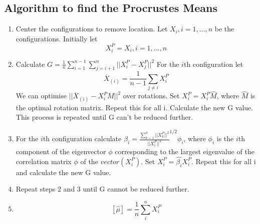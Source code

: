 \documentclass{article}
\begin{document}
\subsection{Algorithm to find the Procrustes Means}
\begin{enumerate}
    \item Center the configurations to remove location. Let $X_{i}, i = 1, \dots,n $ be the configurations. Initially let 
    \[X_{i}^{P} = X_{i}, i = 1, \dots,n  \]
    \item Calculate $G = \frac{1}{n} \sum_{i=1}^{n-1} \sum_{j = i+1}^{n} ||X_{i}^{P} - X_{j}^{P}||^{2}$
    For the $i$th configuration let 
    \[\overline{X}_{(i)} = \frac{1}{n-1} \sum_{j \neq i} X_{i}^{P}\]
    We can optimise $|| \overline{X}_{(i)} - X_{i}^{P}M||^{2}$ over rotations.
    Set $X_{i}^{P} = X_{i}^{P}\hat{M}$, where $\hat{M}$ is the optimal rotation matrix. Repeat this for all i.
    Calculate the new G value. This process is repeated until G can't be reduced further.
    \newpage
    \thispagestyle{fancy}
    \item For the $i$th configuration calculate $\hat{\beta_{i}} = \frac{\sum_{k=1}^{n} ||X_{k}^{P}||^{2}}{||X_{i}^{P}||^{2}}^{1/2} \phi_{i}$, 
    where $\phi_{i}$ is the $i$th component  of the eigenvector $\phi$ corresponding to the largest eigenvalue of the correlation
    matrix $\phi$ of the $vector(X_{i}^{P})$.
    Set $X_{i}^{P} = \hat{\beta_{i}}X_{i}^{P}$. Repeat this for all i and calculate the new G value.
    \item Repeat steps 2 and 3 until G cannot be reduced further.
    \item \[ [\hat{\mu}] = \frac{1}{n} \sum_{i}^{n} X_{i}^{P}\]
\end{enumerate}
\end{document}

